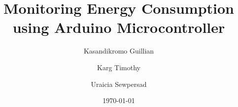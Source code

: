 \documentclass[11pt]{article}
\date{\today}
\author{Kasandikromo Guillian}
\author{Karg Timothy}
\author{Uraicia Sewpersad}
\affil{Vanguard Community College - Department of Engineering}
\title{\huge \bfseries
    Monitoring Energy Consumption using Arduino Microcontroller}
\begin{document}
    \begin{multicols}{2}
        \maketitle
        \thispagestyle{fancy}
       \begin{abstract}
        \setlength{\baselineskip}{1.2\baselineskip}
        \noindent
        \end{abstract}

        
        
        
        
        
        
        

        \end{multicols}

\end{document}
